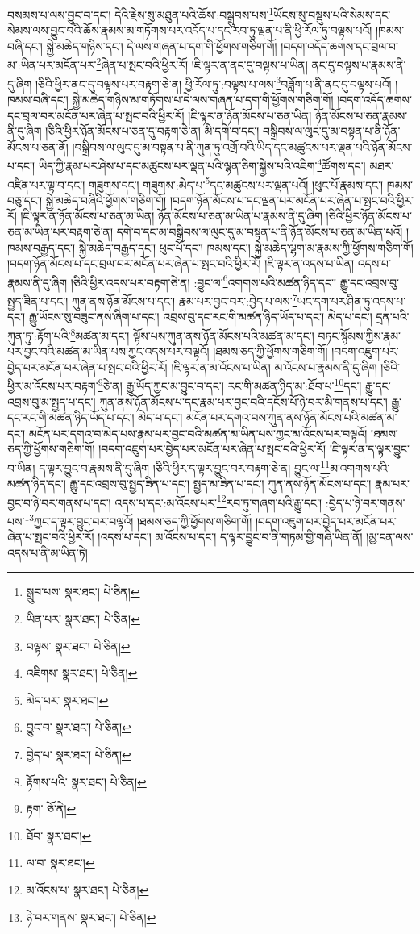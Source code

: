 བསམས་པ་ལས་བྱུང་བ་དང་། དེའི་རྗེས་སུ་མཐུན་པའི་ཆོས་:བསྒྲུབས་པས་\footnote{སྒྲུབ་པས་  སྣར་ཐང་།  པེ་ཅིན། }ཡོངས་སུ་བསྡུས་པའི་སེམས་དང་སེམས་ལས་བྱུང་བའི་ཆོས་རྣམས་མ་གཏོགས་པར་འདོད་པ་དང་རབ་ཏུ་ལྡན་པ་ནི་ཕྱི་རོལ་ཏུ་བལྟས་པའོ། །ཁམས་བཞི་དང་། སྐྱེ་མཆེད་གཉིས་དང་། དེ་ལས་གཞན་པ་དག་གི་ཕྱོགས་གཅིག་གོ། །བདག་འདོད་ཆགས་དང་བྲལ་བ་མ་:ཡིན་པར་མངོན་པར་\footnote{ཡིན་པར་  སྣར་ཐང་།  པེ་ཅིན། }ཞེན་པ་སྤང་བའི་ཕྱིར་རོ། །ཇི་ལྟར་ན་ནང་དུ་བལྟས་པ་ཡིན། ནང་དུ་བལྟས་པ་རྣམས་ནི་དུ་ཞིག །ཅིའི་ཕྱིར་ནང་དུ་བལྟས་པར་བརྟག་ཅེ་ན། ཕྱི་རོལ་ཏུ་:བལྟས་པ་ལས་\footnote{བལྟས་  སྣར་ཐང་།  པེ་ཅིན། }བཟློག་པ་ནི་ནང་དུ་བལྟས་པའོ། །ཁམས་བཞི་དང་། སྐྱེ་མཆེད་གཉིས་མ་གཏོགས་པ་དེ་ལས་གཞན་པ་དག་གི་ཕྱོགས་གཅིག་གོ། །བདག་འདོད་ཆགས་དང་བྲལ་བར་མངོན་པར་ཞེན་པ་སྤང་བའི་ཕྱིར་རོ། །ཇི་ལྟར་ན་ཉོན་མོངས་པ་ཅན་ཡིན། ཉོན་མོངས་པ་ཅན་རྣམས་ནི་དུ་ཞིག །ཅིའི་ཕྱིར་ཉོན་མོངས་པ་ཅན་དུ་བརྟག་ཅེ་ན། མི་དགེ་བ་དང་། བསྒྲིབས་ལ་ལུང་དུ་མ་བསྟན་པ་ནི་ཉོན་མོངས་པ་ཅན་ནོ། །བསྒྲིབས་ལ་ལུང་དུ་མ་བསྟན་པ་ནི་ཀུན་ཏུ་འགྲོ་བའི་ཡིད་དང་མཚུངས་པར་ལྡན་པའི་ཉོན་མོངས་པ་དང་། ཡིད་ཀྱི་རྣམ་པར་ཤེས་པ་དང་མཚུངས་པར་ལྡན་པའི་ལྷན་ཅིག་སྐྱེས་པའི་འཇིག་\footnote{འཇིགས་  སྣར་ཐང་།  པེ་ཅིན། }ཚོགས་དང་། མཐར་འཛིན་པར་ལྟ་བ་དང་། གཟུགས་དང་། གཟུགས་:མེད་པ་\footnote{མེད་པར་  སྣར་ཐང་། }དང་མཚུངས་པར་ལྡན་པའོ། །ཕུང་པོ་རྣམས་དང་། ཁམས་བཅུ་དང་། སྐྱེ་མཆེད་བཞིའི་ཕྱོགས་གཅིག་གོ། །བདག་ཉོན་མོངས་པ་དང་ལྡན་པར་མངོན་པར་ཞེན་པ་སྤང་བའི་ཕྱིར་རོ། །ཇི་ལྟར་ན་ཉོན་མོངས་པ་ཅན་མ་ཡིན། ཉོན་མོངས་པ་ཅན་མ་ཡིན་པ་རྣམས་ནི་དུ་ཞིག །ཅིའི་ཕྱིར་ཉོན་མོངས་པ་ཅན་མ་ཡིན་པར་བརྟག་ཅེ་ན། དགེ་བ་དང་མ་བསྒྲིབས་ལ་ལུང་དུ་མ་བསྟན་པ་ནི་ཉོན་མོངས་པ་ཅན་མ་ཡིན་པའོ། །ཁམས་བརྒྱད་དང་། སྐྱེ་མཆེད་བརྒྱད་དང་། ཕུང་པོ་དང་། ཁམས་དང་། སྐྱེ་མཆེད་ལྷག་མ་རྣམས་ཀྱི་ཕྱོགས་གཅིག་གོ། །བདག་ཉོན་མོངས་པ་དང་བྲལ་བར་མངོན་པར་ཞེན་པ་སྤང་བའི་ཕྱིར་རོ། །ཇི་ལྟར་ན་འདས་པ་ཡིན། འདས་པ་རྣམས་ནི་དུ་ཞིག །ཅིའི་ཕྱིར་འདས་པར་བརྟག་ཅེ་ན། :བྱུང་ལ་\footnote{བྱུང་བ་  སྣར་ཐང་།  པེ་ཅིན། }འགགས་པའི་མཚན་ཉིད་དང་། རྒྱུ་དང་འབྲས་བུ་སྤྱད་ཟིན་པ་དང་། ཀུན་ནས་ཉོན་མོངས་པ་དང་། རྣམ་པར་བྱང་བར་:བྱེད་པ་ལས་\footnote{བྱེད་པ་  སྣར་ཐང་།  པེ་ཅིན། }ཡང་དག་པར་ཤིན་ཏུ་འདས་པ་དང་། རྒྱུ་ཡོངས་སུ་བཟུང་ནས་ཞིག་པ་དང་། འབྲས་བུ་དང་རང་གི་མཚན་ཉིད་ཡོད་པ་དང་། མེད་པ་དང་། དྲན་པའི་ཀུན་ཏུ་:རྟོག་པའི་\footnote{རྟོགས་པའི་  སྣར་ཐང་།  པེ་ཅིན། }མཚན་མ་དང་། ལྟོས་པས་ཀུན་ནས་ཉོན་མོངས་པའི་མཚན་མ་དང་། བཏང་སྙོམས་ཀྱིས་རྣམ་པར་བྱང་བའི་མཚན་མ་ཡིན་པས་ཀྱང་འདས་པར་བལྟའོ། །ཐམས་ཅད་ཀྱི་ཕྱོགས་གཅིག་གོ། །བདག་འཇུག་པར་བྱེད་པར་མངོན་པར་ཞེན་པ་སྤང་བའི་ཕྱིར་རོ། །ཇི་ལྟར་ན་མ་འོངས་པ་ཡིན། མ་འོངས་པ་རྣམས་ནི་དུ་ཞིག །ཅིའི་ཕྱིར་མ་འོངས་པར་བརྟག་\footnote{རྟག་  ཅོ་ནེ། }ཅེ་ན། རྒྱུ་ཡོད་ཀྱང་མ་བྱུང་བ་དང་། རང་གི་མཚན་ཉིད་མ་:ཐོབ་པ་\footnote{ཐོབ་  སྣར་ཐང་། }དང་། རྒྱུ་དང་འབྲས་བུ་མ་སྤྱད་པ་དང་། ཀུན་ནས་ཉོན་མོངས་པ་དང་རྣམ་པར་བྱང་བའི་དངོས་པོ་ཉེ་བར་མི་གནས་པ་དང་། རྒྱུ་དང་རང་གི་མཚན་ཉིད་ཡོད་པ་དང་། མེད་པ་དང་། མངོན་པར་དགའ་བས་ཀུན་ནས་ཉོན་མོངས་པའི་མཚན་མ་དང་། མངོན་པར་དགའ་བ་མེད་པས་རྣམ་པར་བྱང་བའི་མཚན་མ་ཡིན་པས་ཀྱང་མ་འོངས་པར་བལྟའོ། །ཐམས་ཅད་ཀྱི་ཕྱོགས་གཅིག་གོ། །བདག་འཇུག་པར་བྱེད་པར་མངོན་པར་ཞེན་པ་སྤང་བའི་ཕྱིར་རོ། །ཇི་ལྟར་ན་ད་ལྟར་བྱུང་བ་ཡིན། ད་ལྟར་བྱུང་བ་རྣམས་ནི་དུ་ཞིག །ཅིའི་ཕྱིར་ད་ལྟར་བྱུང་བར་བརྟག་ཅེ་ན། བྱུང་ལ་\footnote{ལ་བ་  སྣར་ཐང་། }མ་འགགས་པའི་མཚན་ཉིད་དང་། རྒྱུ་དང་འབྲས་བུ་སྤྱད་ཟིན་པ་དང་། སྤྱད་མ་ཟིན་པ་དང་། ཀུན་ནས་ཉོན་མོངས་པ་དང་། རྣམ་པར་བྱང་བ་ཉེ་བར་གནས་པ་དང་། འདས་པ་དང་:མ་འོངས་པར་\footnote{མ་འོངས་པ་  སྣར་ཐང་།  པེ་ཅིན། }རབ་ཏུ་གཞག་པའི་རྒྱུ་དང་། :བྱེད་པ་ཉེ་བར་གནས་པས་\footnote{ཉེ་བར་གནས་  སྣར་ཐང་།  པེ་ཅིན། }ཀྱང་ད་ལྟར་བྱུང་བར་བལྟའོ། །ཐམས་ཅད་ཀྱི་ཕྱོགས་གཅིག་གོ། །བདག་འཇུག་པར་བྱེད་པར་མངོན་པར་ཞེན་པ་སྤང་བའི་ཕྱིར་རོ། །འདས་པ་དང་། མ་འོངས་པ་དང་། ད་ལྟར་བྱུང་བ་ནི་གཏམ་གྱི་གཞི་ཡིན་ནོ། །མྱ་ངན་ལས་འདས་པ་ནི་མ་ཡིན་ཏེ། 
